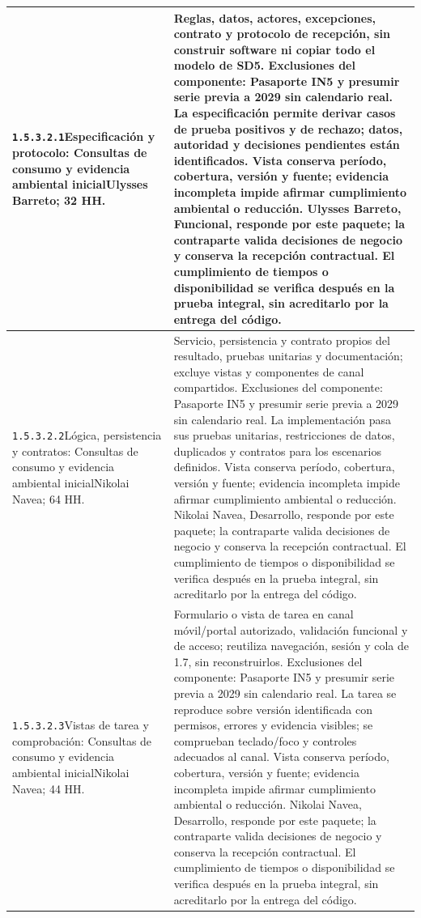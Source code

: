 \begin{longtable}{L{52mm}L{91mm}}
\texttt{1.\allowbreak{}5.\allowbreak{}3.\allowbreak{}2.\allowbreak{}1}\newline Especificación y protocolo: Consultas de consumo y evidencia ambiental inicial\newline Ulysses Barreto; 32 HH. & Reglas, datos, actores, excepciones, contrato y protocolo de recepción, sin construir software ni copiar todo el modelo de SD5. Exclusiones del componente: Pasaporte IN5 y presumir serie previa a 2029 sin calendario real. La especificación permite derivar casos de prueba positivos y de rechazo; datos, autoridad y decisiones pendientes están identificados. Vista conserva período, cobertura, versión y fuente; evidencia incompleta impide afirmar cumplimiento ambiental o reducción. Ulysses Barreto, Funcional, responde por este paquete; la contraparte valida decisiones de negocio y conserva la recepción contractual. El cumplimiento de tiempos o disponibilidad se verifica después en la prueba integral, sin acreditarlo por la entrega del código.\\\hline
\texttt{1.\allowbreak{}5.\allowbreak{}3.\allowbreak{}2.\allowbreak{}2}\newline Lógica, persistencia y contratos: Consultas de consumo y evidencia ambiental inicial\newline Nikolai Navea; 64 HH. & Servicio, persistencia y contrato propios del resultado, pruebas unitarias y documentación; excluye vistas y componentes de canal compartidos. Exclusiones del componente: Pasaporte IN5 y presumir serie previa a 2029 sin calendario real. La implementación pasa sus pruebas unitarias, restricciones de datos, duplicados y contratos para los escenarios definidos. Vista conserva período, cobertura, versión y fuente; evidencia incompleta impide afirmar cumplimiento ambiental o reducción. Nikolai Navea, Desarrollo, responde por este paquete; la contraparte valida decisiones de negocio y conserva la recepción contractual. El cumplimiento de tiempos o disponibilidad se verifica después en la prueba integral, sin acreditarlo por la entrega del código.\\\hline
\texttt{1.\allowbreak{}5.\allowbreak{}3.\allowbreak{}2.\allowbreak{}3}\newline Vistas de tarea y comprobación: Consultas de consumo y evidencia ambiental inicial\newline Nikolai Navea; 44 HH. & Formulario o vista de tarea en canal móvil/portal autorizado, validación funcional y de acceso; reutiliza navegación, sesión y cola de 1.7, sin reconstruirlos. Exclusiones del componente: Pasaporte IN5 y presumir serie previa a 2029 sin calendario real. La tarea se reproduce sobre versión identificada con permisos, errores y evidencia visibles; se comprueban teclado/foco y controles adecuados al canal. Vista conserva período, cobertura, versión y fuente; evidencia incompleta impide afirmar cumplimiento ambiental o reducción. Nikolai Navea, Desarrollo, responde por este paquete; la contraparte valida decisiones de negocio y conserva la recepción contractual. El cumplimiento de tiempos o disponibilidad se verifica después en la prueba integral, sin acreditarlo por la entrega del código.\\\hline

\end{longtable}
